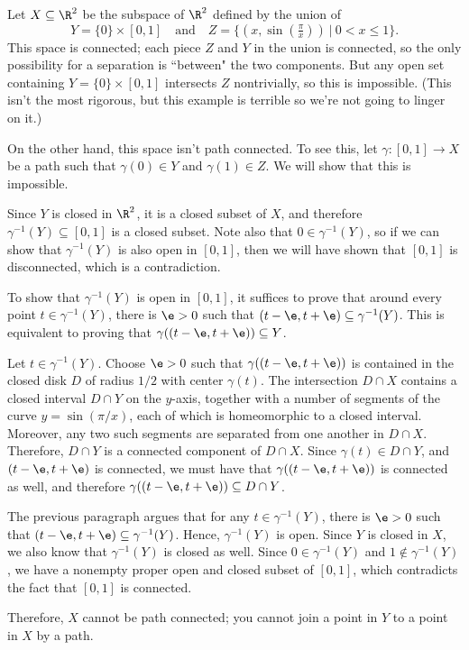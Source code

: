 \documentclass[noname]{notes}
\begin{document}
\begin{example}
	Let $X \subseteq \R^2$ be the subspace of $\R^2$ defined by the union of 
	\[
		Y = \{0\} \times [0,1] \quad \text{and} \quad Z = \Big\{ \left(x, \sin(\tfrac{\pi}{x}) \right) \ \Big\vert\ 0 < x \leq 1\Big\}. 
	\]
	This space is connected; each piece $Z$ and $Y$ in the union is connected, so the only possibility for a separation is ``between" the two components. But any open set containing $Y = \{0\} \times [0,1]$ intersects $Z$ nontrivially, so this is impossible. (This isn't the most rigorous, but this example is terrible so we're not going to linger on it.) 
	
	On the other hand, this space isn't path connected. To see this, let $\gamma \colon [0,1] \to X$ be a path such that $\gamma(0) \in Y$ and $\gamma(1) \in Z$. We will show that this is impossible. 
	
	Since $Y$ is closed in $\R^2$, it is a closed subset of $X$, and therefore $\gamma^{-1}(Y) \subseteq [0,1]$ is a closed subset. Note also that $0 \in \gamma^{-1}(Y)$, so if we can show that $\gamma^{-1}(Y)$ is also open in $[0,1]$, then we will have shown that $[0,1]$ is disconnected, which is a contradiction. 
	
	To show that $\gamma^{-1}(Y)$ is open in $[0,1]$, it suffices to prove that around every point $t \in \gamma^{-1}(Y)$, there is $\e > 0$ such that $(t - \e, t + \e) \subseteq \gamma^{-1}(Y)$. This is equivalent to proving that $\gamma((t-\e,t+\e)) \subseteq Y$. 
	
	Let $t \in \gamma^{-1}(Y)$. Choose $\e > 0$ such that $\gamma((t-\e,t+\e))$ is contained in the closed disk $D$ of radius $1/2$ with center $\gamma(t)$. The intersection $D \cap X$ contains a closed interval $D \cap Y$ on the $y$-axis, together with a number of segments of the curve $y = \sin(\pi/x)$, each of which is homeomorphic to a closed interval. Moreover, any two such segments are separated from one another in $D \cap X$. Therefore, $D \cap Y$ is a connected component of $D \cap X$. Since $\gamma(t) \in D \cap Y$, and $(t - \e, t + \e)$ is connected, we must have that $\gamma((t-\e,t+\e))$ is connected as well, and therefore $\gamma((t-\e,t+\e)) \subseteq D \cap Y$. 
	
	The previous paragraph argues that for any $t \in \gamma^{-1}(Y)$, there is $\e > 0$ such that $(t-\e,t+\e) \subseteq \gamma^{-1}(Y)$. Hence, $\gamma^{-1}(Y)$ is open. Since $Y$ is closed in $X$, we also know that $\gamma^{-1}(Y)$ is closed as well. Since $0 \in \gamma^{-1}(Y)$ and $1 \not \in \gamma^{-1}(Y)$, we have a nonempty proper open and closed subset of $[0,1]$, which contradicts the fact that $[0,1]$ is connected. 
	
	Therefore, $X$ cannot be path connected; you cannot join a point in $Y$ to a point in $X$ by a path. 
\end{example}
\end{document}
